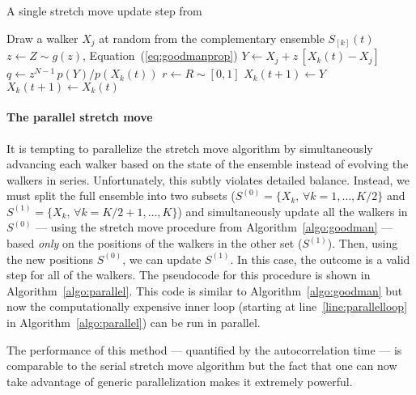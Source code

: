 \documentclass[12pt,preprint]{aastex}
\newcommand{\Eq}[1]{Equation~(\ref{eq:#1})}
\newcommand{\eq}[1]{\Eq{#1}}
\newcommand{\Algo}[1]{Algorithm~\ref{algo:#1}}
\newcommand{\algo}[1]{\Algo{#1}}
\newcommand{\algolabel}[1]{\label{algo:#1}}
\newcommand{\ensemble}{S}
\newcommand{\colorens}[1]{\ensemble^{(#1)}}
\newcommand{\red}{\colorens{0}}
\newcommand{\blue}{\colorens{1}}
\renewcommand{\vector}[1]{#1}
\begin{document}
\begin{algorithm}
\caption{A single stretch move update step from 
    \algolabel{goodman}}
\begin{algorithmic}[1]
    \STATE Draw a walker $X_j$ at random from the complementary ensemble %
        $\ensemble_{[k]}(t)$
    \STATE $z \gets Z \sim g(z)$, \Eq{goodmanprop}
    \STATE $\vector{Y} \gets \vector{X_j} %
                + z \, [ \vector{X_k} (t) - \vector{X_j}]$
    \STATE $q \gets z^{N-1} \, p(Y)/p(X_k(t))$ \label{line:hard}%
        \hspace{1cm}{\footnotesize\it // This line is generally expensive}
    \STATE $r \gets R \sim [0, 1]$
    \IF{$r \le q$, \eq{acceptance}}
        \STATE $X_k(t+1) \gets Y$
    \ELSE
        \STATE $X_k(t+1) \gets X_k(t)$
    \ENDIF
\ENDFOR
\end{algorithmic}
\end{algorithm}

\paragraph{The parallel stretch move}

It is tempting to parallelize the stretch move algorithm by
simultaneously advancing each walker based on the state of the ensemble
instead of evolving the walkers in series. Unfortunately, this subtly
violates detailed balance. Instead, we must split the full ensemble
into two subsets
($\red = \{ \vector{X_k}, \, \forall k = 1, \ldots, K/2 \}$ and
$\blue = \{ \vector{X_k}, \, \forall k = K/2+1, \ldots, K \}$) and
simultaneously update all the walkers in $\red$
--- using the stretch move procedure from \algo{goodman} ---
based \emph{only} on the positions of the walkers in the other set
($\blue$). Then, using the new positions $\red$,
we can update $\blue$. In this case, the outcome is a valid step
for all of the walkers. The pseudocode for
this procedure is shown in \algo{parallel}. This code is similar to
\algo{goodman} but now the computationally expensive inner loop
(starting at line~\ref{line:parallelloop} in \algo{parallel}) can be run in
parallel.

The performance of this method --- quantified by the autocorrelation time ---
is comparable to the serial stretch move algorithm but the fact that one
can now take advantage of generic parallelization makes it
extremely powerful.
\end{document}
